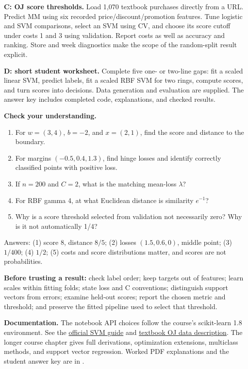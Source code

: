 \documentclass[11pt,a4paper]{article}
\newcommand{\code}[1]{\texttt{\small\detokenize{#1}}}
\begin{document}
\textbf{C: OJ score thresholds.} Load 1,070 textbook purchases directly from a URL. Predict MM using six recorded
price/discount/promotion features. Tune logistic and SVM comparisons, select an SVM using CV, and choose its score
cutoff under costs 1 and 3 using validation. Report costs as well as accuracy and ranking. Store and week diagnostics
make the scope of the random-split result explicit.

\textbf{D: short student worksheet.} Complete five one- or two-line gaps: fit a scaled linear SVM, predict labels,
fit a scaled RBF SVM for two rings, compute scores, and turn scores into decisions. Data generation and evaluation
are supplied. The answer key includes completed code, explanations, and checked results.

\textbf{Check your understanding.}
\begin{enumerate}
\item For $w=(3,4)$, $b=-2$, and $x=(2,1)$, find the score and distance to the boundary.
\item For margins $(-0.5,0.4,1.3)$, find hinge losses and identify correctly classified points with positive loss.
\item If $n=200$ and $C=2$, what is the matching mean-loss $\lambda$?
\item For RBF gamma 4, at what Euclidean distance is similarity $e^{-1}$?
\item Why is a score threshold selected from validation not necessarily zero? Why is it not automatically 1/4?
\end{enumerate}
Answers: (1) score 8, distance $8/5$; (2) losses $(1.5,0.6,0)$, middle point;
(3) $1/400$; (4) $1/2$; (5) costs and score distributions matter, and scores are not probabilities.

\textbf{Before trusting a result:} check label order; keep targets out of features; learn scales within fitting folds;
state loss and C conventions; distinguish support vectors from errors; examine held-out scores; report the chosen
metric and threshold; and preserve the fitted pipeline used to select that threshold.

\textbf{Documentation.} The notebook API choices follow the course's scikit-learn 1.8 environment.
See the \href{https://scikit-learn.org/1.8/modules/svm.html}{official SVM guide} and
\href{https://intro-stat-learning.github.io/ISLP/datasets/OJ.html}{textbook OJ data description}.
The longer course chapter gives full derivations, optimization extensions, multiclass methods, and support vector regression.
Worked PDF explanations and the student answer key are in \code{FocusedContent/Solutions}.
\end{document}
